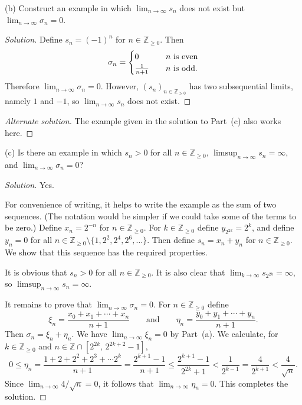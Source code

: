 \documentclass[10pt]{amsart}
\newcommand{\M}{\setminus}
\newcommand{\I}{\infty}
\newcommand{\andeqn}{\qquad {\mbox{and}} \qquad}
\newcommand{\limi}[1]{\lim_{{#1} \to \infty}}
\theoremstyle{definition}
\newcommand{\et}{\eta}
\newcommand{\sm}{\sigma}
\newcommand{\Z}{{\mathbb{Z}}}
\newcommand{\Nz}{{\mathbb{Z}}_{\geq 0}}
\begin{document}
(b)
Construct an example in which $\limi{n} s_n$ does not exist
but $\limi{n} \sm_n = 0$.

\begin{proof}[Solution]
Define $s_n = (-1)^n$ for $n \in \Nz$.
Then
\[
\sm_n = \begin{cases}
   0               & \hspace*{1em} {\mbox{$n$ is even}}
        \\
   \frac{1}{n + 1} & \hspace*{1em} {\mbox{$n$ is odd}}.
\end{cases}
\]
Therefore $\limi{n} \sm_n = 0$.
However,
$(s_n)_{n \in \Nz}$ has two subsequential limits,
namely $1$ and $-1$,
so $\limi{n} s_n$ does not exist.
\end{proof}

\begin{proof}[Alternate solution]
The example given in the solution to Part~(c)
also works here.
\end{proof}

(c)
Is there an example in which $s_n > 0$ for all $n \in \Nz$,
$\limsup_{n \to \I} s_n = \I$,
and $\limi{n} \sm_n = 0$?

\begin{proof}[Solution]
Yes.

For convenience of writing,
it helps to write the example as the sum of two sequences.
(The notation would be simpler
if we could take some of the terms to be zero.)
Define $x_n = 2^{- n}$ for $n \in \Nz$.
For $k \in \Nz$ define $y_{2^{2 k}} = 2^k$,
and define $y_n = 0$ for all
$n \in \Nz \M \bigl\{ 1, 2^2, 2^4, 2^6, \ldots  \bigr\}$.
Then define $s_n = x_n + y_n$ for $n \in \Nz$.
We show that this sequence has the required properties.

It is obvious that $s_n > 0$ for all $n \in \Nz$.
It is also clear that
$\limi{k} s_{2^{2 k}} = \I$,
so $\limsup_{n \to \I} s_n = \I$.

It remains to prove that $\limi{n} \sm_n = 0$.
For $n \in \Nz$
define
\[
\xi_n = \frac{x_0 + x_1 + \cdots + x_n}{n + 1}
\andeqn
\et_n = \frac{y_0 + y_1 + \cdots + y_n}{n + 1}.
\]
Then $\sm_n = \xi_n + \et_n$.
We have $\limi{n} \xi_n = 0$ by Part~(a).
We calculate, for $k \in \Nz$
and $n \in \Z \cap [2^{2 k}, \, 2^{2 k + 2} - 1 ]$,
\[
0 \leq \et_{n}
  = \frac{1 + 2 + 2^2 + 2^3 + \cdots 2^{k}}{n + 1}
  = \frac{2^{k + 1} - 1}{n + 1}
  \leq \frac{2^{k + 1} - 1}{2^{2 k} + 1}
  < \frac{1}{2^{k - 1}}
  = \frac{4}{2^{k + 1}}
  < \frac{4}{\sqrt{n}}.
\]
Since $\limi{n} 4 / \sqrt{n} = 0$,
it follows that $\limi{n} \et_{n} = 0$.
This completes the solution.
\end{proof}
\end{document}
